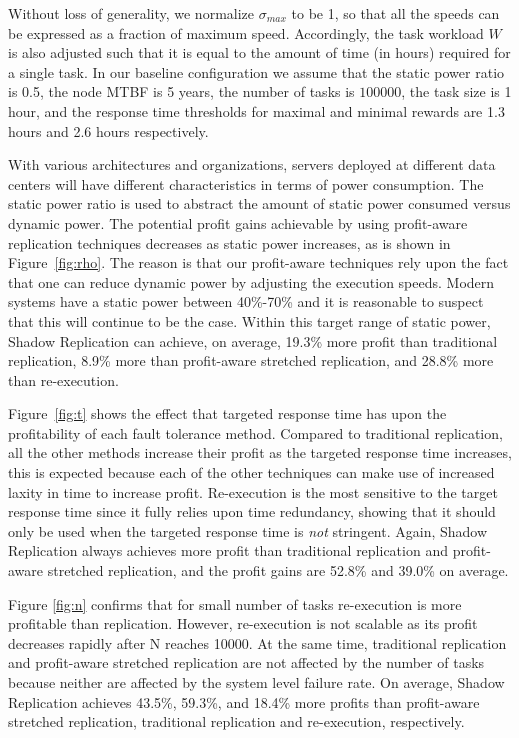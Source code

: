 Without loss of generality, we normalize $\sigma_{max}$ to be 1, so
that all the speeds can be expressed as a fraction of maximum
speed. Accordingly, the task workload $W$ is also adjusted such that
it is equal to the amount of time (in hours) required for a single
task. %
In our baseline configuration we
assume that the static power ratio is 0.5, the node MTBF is 5 
years, the number of tasks is $100000$, the task size is 1 hour, and the response time thresholds for
maximal and minimal rewards are 1.3 hours and 2.6 hours
respectively. 


With various architectures and organizations, servers deployed at
different data centers will have different characteristics in terms of
power consumption. The static power ratio is used to abstract the
amount of static power consumed versus dynamic power.  
The potential profit gains achievable by using profit-aware
replication techniques decreases as static power increases, as is shown
in Figure~\ref{fig:rho}. The reason is that our profit-aware
techniques rely upon the fact that one can reduce dynamic power by
adjusting the execution speeds. Modern systems have a static power between 40\%-70\% and
it is reasonable to suspect that this will continue to be the case. Within
this target range of static power, Shadow Replication can achieve, on
average, 19.3\% more profit than traditional replication, 8.9\% more
than profit-aware stretched replication, and 28.8\% more than re-execution.

Figure~\ref{fig:t} shows the effect that targeted response time has upon
the profitability of each fault tolerance method. %
Compared to traditional replication, all the other methods increase their profit as the targeted
response time increases, this is expected because each of the other
techniques can make use of increased laxity in time to increase
profit. Re-execution is the most sensitive to the target response
time since it fully relies upon time redundancy, showing that it should only be used when the targeted response time is \emph{not} stringent. 
Again, Shadow Replication always achieves more profit than traditional
replication and profit-aware stretched replication, and the profit
gains are 52.8\% and 39.0\% on average. 

Figure \ref{fig:n} confirms that for small number of tasks
re-execution is more profitable than replication. However, re-execution is not scalable
as its profit decreases rapidly after N reaches 10000. At the same time, traditional
replication and profit-aware stretched replication are not
affected by the number of tasks because neither are affected by the
system level failure rate. On average, Shadow Replication achieves 43.5\%, 59.3\%, and 18.4\%
more profits than profit-aware stretched replication, traditional replication and re-execution, respectively. 

